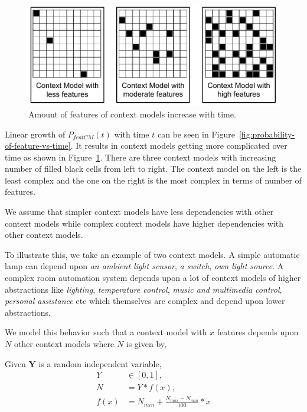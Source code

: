 \begin{figure}[!htb]
  \centering
  \includegraphics[width=12cm]{figures/feature-level-of-context-models.pdf}
  \caption{Amount of features of context models increase with time.}
  \label{fig:feature-level-of-context-models}
\end{figure}

Linear growth of $P_{featCM}(t)$ with time $t$ can be seen in Figure~\ref{fig:probability-of-feature-vs-time}. It results in context models getting more complicated over time as shown in Figure~\ref{fig:feature-level-of-context-models}. There are three context models with increasing number of filled black cells from left to right. The context model on the left is the least complex and the one on the right is the most complex in terms of number of features.

We assume that simpler context models have less dependencies with other context models while complex context models have higher dependencies with other context models.

To illustrate this, we take an example of two context models. A simple automatic lamp can depend upon \emph{an ambient light sensor}, \emph{a switch}, \emph{own light source}. A complex room automation system depends upon a lot of context models of higher abstractions like \emph{lighting}, \emph{temperature control}, \emph{music and multimedia control}, \emph{personal assistance} etc which themselves are complex and depend upon lower abstractions.

We model this behavior such that a context model with $x$ features depends upon $N$ other context models where $N$ is given by,

Given $\textbf{Y}$ is a random independent variable,
\begin{equation}
  \begin{aligned}
    Y &\in [0, 1],\\
    N &= Y * f(x),\\
    f(x) &= N_{min} + \frac{N_{max} - N_{min}}{100} * x
  \end{aligned}
\end{equation}

